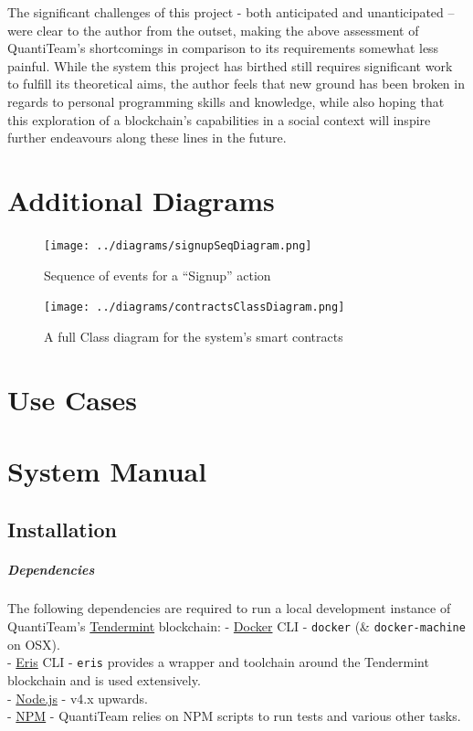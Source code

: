 The significant challenges of this project - both anticipated and
unanticipated -- were clear to the author from the outset, making the
above assessment of QuantiTeam's shortcomings in comparison to its
requirements somewhat less painful. While the system this project has
birthed still requires significant work to fulfill its theoretical aims,
the author feels that new ground has been broken in regards to personal
programming skills and knowledge, while also hoping that this
exploration of a blockchain's capabilities in a social context will
inspire further endeavours along these lines in the future.

\printbibliography

\appendix
\chapter{Additional Diagrams}

\begin{figure}[htbp]
\centering
\texttt{[image: ../diagrams/signupSeqDiagram.png]}
\caption{Sequence of events for a ``Signup'' action}
\end{figure}

\begin{figure}
\centering
\texttt{[image: ../diagrams/contractsClassDiagram.png]}
\caption{A full Class diagram for the system's smart contracts}
\end{figure}

\chapter{Use Cases}




\chapter{System Manual}
\section{Installation}\label{installation}

\paragraph{Dependencies}\label{dependencies}

The following dependencies are required to run a local development
instance of QuantiTeam's
\href{https://github.com/tendermint/tendermint}{Tendermint} blockchain:
- \href{https://www.docker.com/}{Docker} CLI - \texttt{docker} (\&
\texttt{docker-machine} on OSX).\\
- \href{https://erisindustries.com/}{Eris} CLI - \texttt{eris} provides
a wrapper and toolchain around the Tendermint blockchain and is used
extensively.\\
- \href{https://nodejs.org/en/}{Node.js} - v4.x upwards.\\
- \href{https://www.npmjs.com/}{NPM} - QuantiTeam relies on NPM scripts
to run tests and various other tasks.

